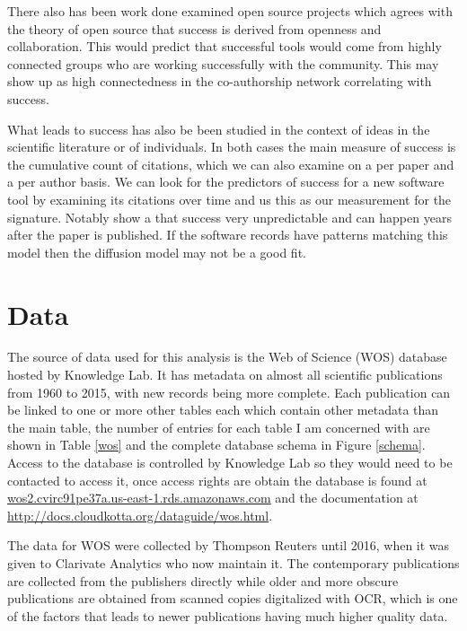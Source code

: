 \documentclass[12pt, a4paper]{article}
\begin{document}
There also has been work done examined open source projects \citep{mockus2002two} which agrees with the theory \citep{raymond1999cathedral} of open source that success is derived from openness and collaboration. This would predict that successful tools would come from highly connected groups who are working successfully with the community. This may show up as high connectedness in the co-authorship network correlating with success.

What leads to success has also be been studied in the context of ideas in the scientific literature \citep{acharya2004ideas} \citep{johntalk} or of individuals\citep{sinatra2016quantifying}. In both cases the main measure of success is the cumulative count of citations, which we can also examine on a per paper and a per author basis. We can look for the predictors of success for a new software tool by examining its citations over time and us this as our measurement for the signature. Notably \cite{sinatra2016quantifying} show a that success very unpredictable and can happen years after the paper is published. If the software records have patterns matching this model then the diffusion model may not be a good fit.

\section{Data}

The source of data used for this analysis is the  Web of Science (WOS) database hosted by Knowledge Lab. It has metadata on almost all scientific publications from 1960 to 2015, with new records being more complete. Each publication can be linked to one or more other tables each which contain other metadata than the main table, the number of entries for each table I am concerned with are shown in Table \ref{wos} and the complete database schema in Figure \ref{schema}. Access to the database is controlled by Knowledge Lab so they would need to be contacted to access it, once access rights are obtain the database is found at \href{wos2.cvirc91pe37a.us-east-1.rds.amazonaws.com}{wos2.cvirc91pe37a.us-east-1.rds.amazonaws.com} and the documentation at \href{http://docs.cloudkotta.org/dataguide/wos.html}{http://docs.cloudkotta.org/dataguide/wos.html}.

The data for WOS were collected by Thompson Reuters until 2016, when it was given to  Clarivate Analytics who now maintain it. The contemporary publications are collected from the publishers directly while older and more obscure publications are obtained from scanned copies digitalized with OCR, which is one of the factors that leads to newer publications having much higher quality data.
\end{document}
